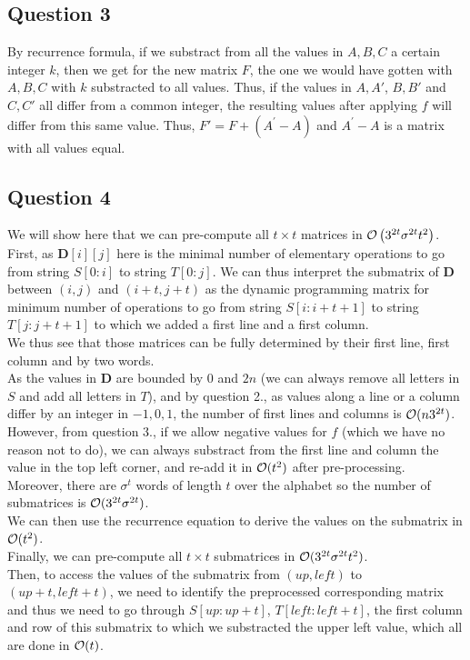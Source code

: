 \documentclass{cours}
\begin{document}
\subsection{Question 3}
By recurrence formula, if we substract from all the values in $A, B, C$ a certain integer $k$, then we get for the new matrix $F$, the one we would have gotten with $A, B, C$ with $k$ substracted to all values. Thus, if the values in $A, A'$, $B, B'$ and $C, C'$ all differ from a common integer, the resulting values after applying $f$ will differ from this same value. Thus, $F' = F +(A^{'} - A)$ and $A^{'} - A$ is a matrix with all values equal.

\subsection{Question 4}
We will show here that we can pre-compute all $t \times t$ matrices in $\mathcal{O}\left(3^{2t}\sigma^{2t}t^{2}\right)$.\\
First, as $\mathbf{D}[i][j]$ here is the minimal number of elementary operations to go from string $S[0:i]$ to string $T[0:j]$. We can thus interpret the submatrix of $\mathbf{D}$ between $(i, j)$ and $(i + t, j + t)$ as the dynamic programming matrix for minimum number of operations to go from string $S[i : i + t+ 1]$ to string $T[j : j + t + 1]$ to which we added a first line and a first column.\\
We thus see that those matrices can be fully determined by their first line, first column and by two words.\\
As the values in $\mathbf{D}$ are bounded by $0$ and $2n$ (we can always remove all letters in $S$ and add all letters in $T$), and by question 2., as values along a line or a column differ by an integer in ${-1, 0, 1}$, the number of first lines and columns is $\mathcal{O}{(n3^{2t})}$. However, from question 3., if we allow negative values for $f$ (which we have no reason not to do), we can always substract from the first line and column the value in the top left corner, and re-add it in $\mathcal{O}(t^2)$ after pre-processing.\\
Moreover, there are $\sigma^{t}$ words of length $t$ over the alphabet so the number of submatrices is $\mathcal{O}({3^{2t}\sigma^{2t}})$. \\
We can then use the recurrence equation to derive the values on the submatrix in $\mathcal{O}{(t^{2})}$. \\
Finally, we can pre-compute all $t\times t$ submatrices in $\mathcal{O}{(3^{2t}\sigma^{2t}t^{2})}$.\\
Then, to access the values of the submatrix from $(up, left)$ to $(up + t, left + t)$, we need to identify the preprocessed corresponding matrix and thus we need to go through $S[up:up+t]$, $T[left:left+t]$, the first column and row of this submatrix to which we substracted the upper left value, which all are done in $\mathcal{O}(t)$.
\end{document}
